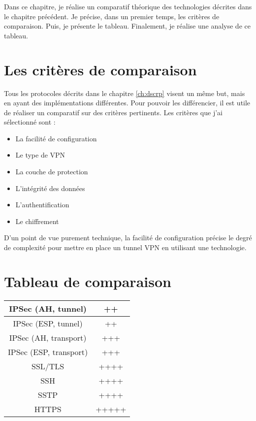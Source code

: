 Dans ce chapitre, je réalise un comparatif théorique des technologies décrites dans le chapitre précédent.
Je précise, dans un premier temps, les critères de comparaison.
Puis, je présente le tableau.
Finalement, je réalise une analyse de ce tableau.
\section{Les critères de comparaison}
Tous les protocoles décrits dans le chapitre \ref{ch:dscrp} visent un même but, mais en ayant des implémentations différentes.
Pour pouvoir les différencier, il est utile de réaliser un comparatif sur des critères pertinents.
Les critères que j'ai sélectionné sont : 
\begin{itemize}
	\item La facilité de configuration
	\item Le type de VPN
	\item La couche de protection
	\item L'intégrité des données
	\item L'authentification
	\item Le chiffrement
\end{itemize}
D'un point de vue purement technique, la facilité de configuration précise le degré de complexité pour mettre en place un tunnel VPN en utilisant une technologie.

\section{Tableau de comparaison}
\begin{center}
\label{tab:techno}
\begin{xtabular}{|c|c|}
\hline
 IPSec (AH, tunnel) & ++\\
 \hline
 IPSec (ESP, tunnel) & ++ \\
 \hline
 IPSec (AH, transport) & +++ \\
 \hline
 IPSec (ESP, transport) & +++ \\
 \hline
 SSL/TLS & ++++\\
 \hline
 SSH & ++++ \\
 \hline
 SSTP & ++++ \\
 \hline
 HTTPS & +++++ \\
 \hline
\end{xtabular}
\end{center}